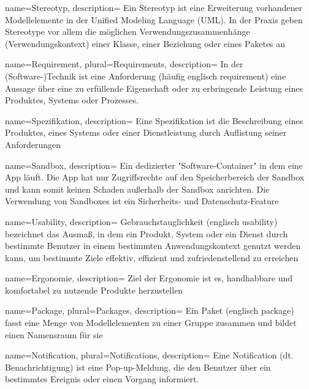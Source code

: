 {
  name=Stereotyp,
  description={
    Ein Stereotyp ist eine Erweiterung vorhandener Modellelemente in der Unified Modeling Language (UML). In der Praxis geben Stereotype vor allem die möglichen Verwendungszusammenhänge (Verwendungskontext) einer Klasse, einer Beziehung oder eines Paketes an}
}

 {
name=Requirement,
plural=Requirements,
description={
In der (Software-)Technik ist eine Anforderung (häufig englisch requirement) eine Aussage über eine zu erfüllende Eigenschaft oder zu erbringende Leistung eines Produktes, Systems oder Prozesses.}
}

{
  name=Spezifikation,
  description={
    Eine Spezifikation ist die Beschreibung eines Produktes, eines Systems oder einer Dienstleistung durch Auflistung seiner Anforderungen}
}

{
  name=Sandbox,
  description={
    Ein dedizierter "Software-Container" in dem eine App läuft. Die App hat nur Zugriffsrechte auf den Speicherbereich der Sandbox und kann somit keinen Schaden außerhalb der Sandbox anrichten. Die Verwendung von Sandboxes ist ein Sicherheits- und Datenschutz-Feature}
}

{
name=Usability,
description={
  Gebrauchstauglichkeit (englisch usability) bezeichnet das Ausmaß, in dem ein Produkt, System oder ein Dienst durch bestimmte Benutzer in einem bestimmten Anwendungskontext genutzt werden kann, um bestimmte Ziele effektiv, effizient und zufriedenstellend zu erreichen}
}

 {
name=Ergonomie,
description={
  Ziel der Ergonomie ist es, handhabbare und komfortabel zu nutzende Produkte herzustellen}
}

 {
name=Package,
plural=Packages,
description={
Ein Paket (englisch package) fasst eine Menge von Modellelementen zu einer Gruppe zusammen und bildet einen Namensraum für sie}
}

 {
name=Notification,
plural=Notifications,
description={
Eine Notification (dt. Benachrichtigung) ist eine Pop-up-Meldung, die den Benutzer über ein bestimmtes Ereignis oder einen Vorgang informiert.
}
}
